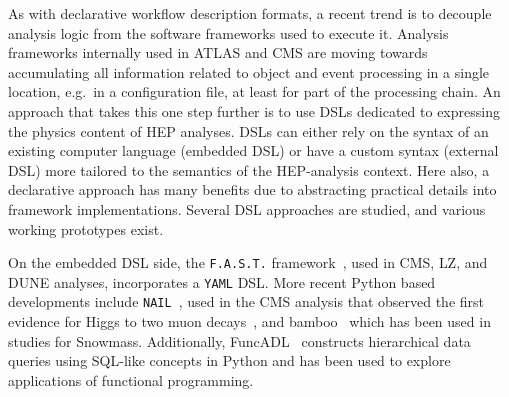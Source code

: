 \documentclass[11pt]{article}
\begin{document}
As with declarative workflow description formats, a recent trend is to decouple analysis logic from the software frameworks used to execute it. Analysis frameworks internally used in \gls{ATLAS} and \gls{CMS}
are moving towards accumulating all information related to object and event processing in a single location, e.g.~in a configuration file, at least for part of the processing chain. An approach that takes this one step further is to use \glspl{DSL} dedicated to expressing the physics content of \gls{HEP} analyses. \glspl{DSL} can either rely on the syntax of an existing computer language (embedded \gls{DSL}) or have a custom syntax (external \gls{DSL}) more tailored to the semantics of the \gls{HEP}-analysis context. Here also, a declarative approach has many benefits due to abstracting practical details into framework implementations. Several \gls{DSL} approaches are studied, and various working prototypes exist.



On the embedded \gls{DSL} side, the \texttt{F.A.S.T.} framework~\cite{FAST}, used in CMS, \gls{LZ}, and \gls{DUNE} analyses, incorporates a \texttt{YAML} \gls{DSL}.
More recent Python based developments include \texttt{NAIL}~\cite{NAIL}, used in the CMS analysis that observed the first evidence for Higgs to two muon decays~\cite{CMS:2020xwi}, and bamboo~\cite{David:2021ohq} which has been used in studies for Snowmass.
Additionally, FuncADL~\cite{Proffitt:2021wfh} constructs hierarchical data queries using SQL-like concepts in Python and has been used to explore applications of functional programming.
\end{document}
